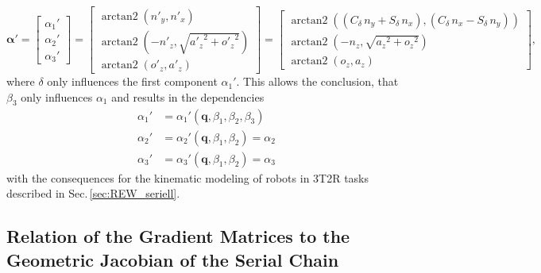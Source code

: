 \documentclass[robotics,article,submit,moreauthors,pdftex]{Definitions/mdpi}
\newcommand{\bm}[1]{\boldsymbol{#1}}
\DeclareMathOperator{\arctantwo}{arctan2}
\begin{document}
\begin{equation}
\bm{\alpha}'
=
\begin{bmatrix}
\alpha_1' \\
\alpha_2' \\
\alpha_3'
\end{bmatrix}
=
\begin{bmatrix}
\arctantwo \left( {n'_y} , { n'_x} \right) \\ 
\arctantwo \left( -{n'_z} , \sqrt {{{a'_z}}^{2}+{{ o'_z}}^{2}} \right) \\ 
\arctantwo \left( {o'_z} , {a'_z} \right)
\end{bmatrix}
=
\begin{bmatrix}
\arctantwo \left( ({ C_{\delta}}\,{n_y}+{ S_{\delta}}\,{n_x}) , ({ C_{\delta}}\,{n_x}-{ S_{\delta}}\,{n_y}) \right) \\
\arctantwo \left( -{n_z} , \sqrt {{{a_z}}^{2}+{{ o_z}}^{2}} \right) \\
\arctantwo \left( {o_z} , {a_z} \right)
\end{bmatrix},
\end{equation}
%
where $\delta$ only influences the first component $\alpha_1'$.
This allows the conclusion, that $\beta_3$ only influences $\alpha_1$ and results in the dependencies
%
\begin{align}
    \alpha_1'&=\alpha_1'(\bm{q},\beta_1,\beta_2,\beta_3)\\
    \alpha_2'&=\alpha_2'(\bm{q},\beta_1,\beta_2) =\alpha_2\\
    \alpha_3'&=\alpha_3'(\bm{q},\beta_1,\beta_2) =\alpha_3
\end{align}
%
with the consequences for the kinematic modeling of robots in 3T2R tasks described in Sec.\,\ref{sec:REW_seriell}.

\subsection{Relation of the Gradient Matrices to the Geometric Jacobian of the Serial Chain}
\label{sec:appendix_gradient_geomjacobian}

\end{document}
